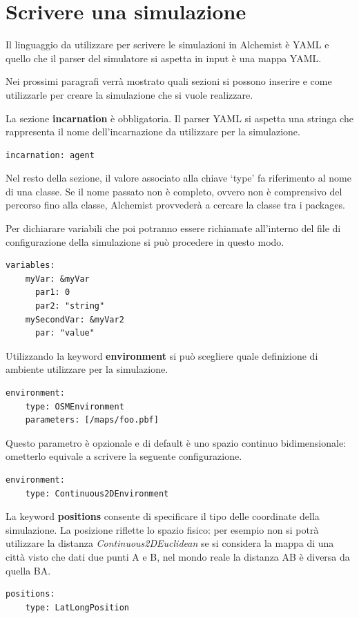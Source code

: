 \section{Scrivere una simulazione}\label{sctn:ScrivereUnaSimulazione}
\switchToProlog{}

Il linguaggio da utilizzare per scrivere le simulazioni in Alchemist è YAML e quello che il parser del simulatore si aspetta in input è una mappa YAML.

Nei prossimi paragrafi verrà mostrato quali sezioni si possono inserire e come utilizzarle per creare la simulazione che si vuole realizzare.

La sezione \textbf{incarnation} è obbligatoria. Il parser YAML si aspetta una stringa che rappresenta il nome dell'incarnazione da utilizzare per la simulazione.
\medskip
\begin{lstlisting}[firstnumber=1, caption={Incarnazione}]
  incarnation: agent
\end{lstlisting}

Nel resto della sezione, il valore associato alla chiave `type' fa riferimento al nome di una classe. Se il nome passato non è completo, ovvero non è comprensivo del percorso fino alla classe, Alchemist provvederà a cercare la classe tra i packages.

Per dichiarare variabili che poi potranno essere richiamate all'interno del file di configurazione della simulazione si può procedere in questo modo.
\medskip
\begin{lstlisting}[firstnumber=1,caption={Variabili simulazione}]
  variables:
    myVar: &myVar
      par1: 0
      par2: "string"
    mySecondVar: &myVar2
      par: "value"
\end{lstlisting}

Utilizzando la keyword \textbf{environment} si può scegliere quale definizione di ambiente utilizzare per la simulazione.
\medskip
\begin{lstlisting}[firstnumber=1,caption={Environment}]
  environment:
    type: OSMEnvironment
    parameters: [/maps/foo.pbf]
\end{lstlisting}
Questo parametro è opzionale e di default è uno spazio continuo bidimensionale: ometterlo equivale a scrivere la seguente configurazione.
\medskip
\begin{lstlisting}[firstnumber=1,caption={Default environment}]
  environment:
    type: Continuous2DEnvironment
\end{lstlisting}

La keyword \textbf{positions} consente di specificare il tipo delle coordinate della simulazione. La posizione riflette lo spazio fisico: per esempio non si potrà utilizzare la distanza \textit{Continuous2DEuclidean} se si considera la mappa di una città visto che dati due punti A e B, nel mondo reale la distanza AB è diversa da quella BA.
\medskip
\begin{lstlisting}[firstnumber=1,caption={Posizioni}]
  positions:
    type: LatLongPosition
\end{lstlisting}

